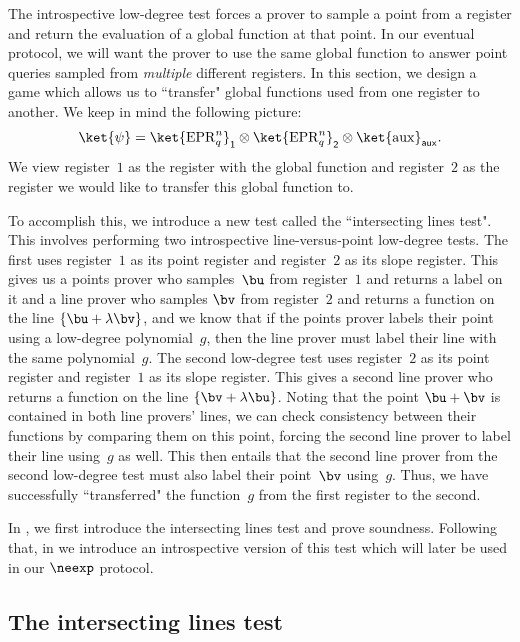 \documentclass[11pt]{article}
\newcommand{\reg}[1]{{\mathsf{#1}}}
\begin{document}
The introspective low-degree test forces a prover to sample a point from a register and return the evaluation of a global function at that point.
In our eventual protocol, we will want the prover to use the same global function to answer point queries sampled from \emph{multiple} different registers.
In this section, we design a game which allows us to ``transfer" global functions used from one register  to another.
We keep in mind the following picture:
\begin{equation*}
\ket{\psi} = \ket{\mathrm{EPR}^n_q}_{\reg{1}} \otimes \ket{\mathrm{EPR}^n_q}_{\reg{2}} \otimes \ket{\mathrm{aux}}_{\reg{aux}}.
\end{equation*}
We view register~$1$ as the register with the global function
and register~$2$ as the register we would like to transfer this global function to.

To accomplish this, we introduce a new test called the ``intersecting lines test".
This involves performing two introspective line-versus-point low-degree tests.
The first uses register~$1$ as its point register and register~$2$ as its slope register.
This gives us a points prover who samples~$\bu$ from register~$1$ and returns a label on it
and a line prover who samples $\bv$ from register~$2$ and returns a function on the line $\{\bu + \lambda \bv\}$,
and we know that if the points prover labels their point using a low-degree polynomial~$g$, 
then the line prover must label their line with the same polynomial~$g$.
The second low-degree test uses register~$2$ as its point register and register~$1$ as its slope register.
This gives a second line prover who returns a function on the line $\{\bv + \lambda \bu\}$.
Noting that the point $\bu + \bv$ is contained in both line provers' lines,
we can check consistency between their functions
by comparing them on this point,
forcing the second line prover to label their line using~$g$ as well.
This then entails that the second line prover from the second low-degree test must also 
label their point~$\bv$ using~$g$.
Thus, we have successfully ``transferred" the function~$g$ from the first register to the second.

In , we first introduce the intersecting lines test and prove soundness.
Following that, in 
we introduce an introspective version of this test which will later be used in our $\neexp$ protocol.

\subsection{The intersecting lines test}\label{sec:intersecting-lines}
\end{document}
